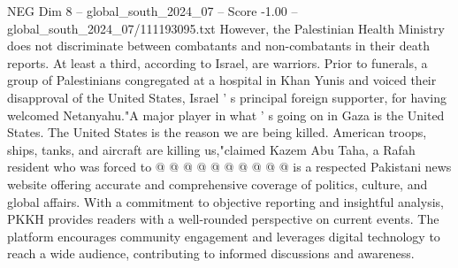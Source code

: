 \begin{textsample}{NEG Dim 8 – global\_south\_2024\_07 – Score -1.00 – global\_south\_2024\_07/111193095.txt}
However, the Palestinian Health Ministry does not discriminate between combatants and non-combatants in their death reports.
At least a third, according to Israel, are warriors.
Prior to funerals, a group of Palestinians congregated at a hospital in Khan Yunis and voiced their disapproval of the United States, Israel ' s principal foreign supporter, for having welcomed Netanyahu."A major player in what ' s going on in Gaza is the United States.
The United States is the reason we are being killed.
American troops, ships, tanks, and aircraft are killing us,"claimed Kazem Abu Taha, a Rafah resident who was forced to @ @ @ @ @ @ @ @ @ @ is a respected Pakistani news website offering accurate and comprehensive coverage of politics, culture, and global affairs.
With a commitment to objective reporting and insightful analysis, PKKH provides readers with a well-rounded perspective on current events.
The platform encourages community engagement and leverages digital technology to reach a wide audience, contributing to informed discussions and awareness.

\end{textsample}
